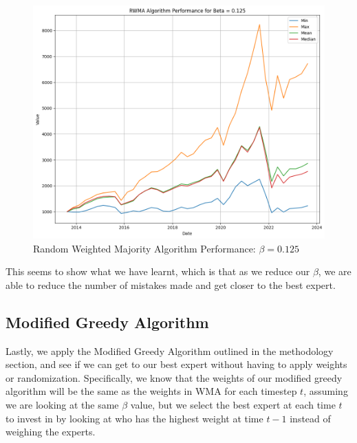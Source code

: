 \documentclass{article}
\begin{document}
\begin{figure}[H]
    \centering
    \includegraphics[width=1\textwidth]{rwma_0.125.png}
    \caption{Random Weighted Majority Algorithm Performance: $\beta=0.125$}
    \label{fig:rwma_0.125}
\end{figure}
This seems to show what we have learnt, which is that as we reduce our $\beta$, we are able to reduce the number of mistakes made and get closer to the best expert.

\subsection{Modified Greedy Algorithm}
Lastly, we apply the Modified Greedy Algorithm outlined in the methodology section, and see if we can get to our best expert without having to apply weights or randomization. Specifically, we know that the weights of our modified greedy algorithm will be the same as the weights in WMA for each timestep $t$, assuming we are looking at the same $\beta$ value, but we select the best expert at each time $t$ to invest in by looking at who has the highest weight at time $t-1$ instead of weighing the experts. 
\end{document}
